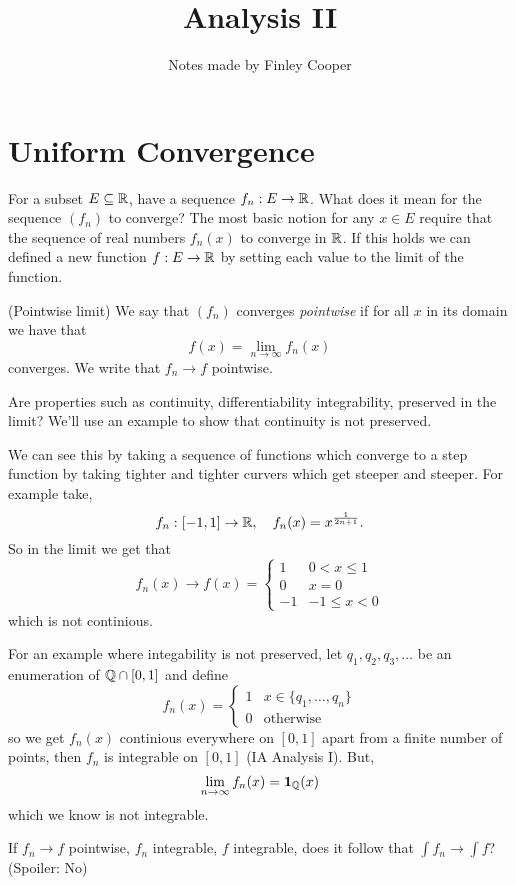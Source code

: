 \documentclass{article}
\title{Analysis II}
\author{Notes made by Finley Cooper}
\begin{document}
  \maketitle
  \newpage
  \tableofcontents
  \newpage
  \section{Uniform Convergence}
For a subset $ E\subseteq \mathbb{R} $, have a sequence $ f_n:E\to \mathbb{R} $. What does it mean for the sequence $ (f_n) $ to converge? The most basic notion for any $ x \in E $ require that the sequence of real numbers $ f_n(x) $ to converge in $ \mathbb{R} $. If this holds we can defined a new function $ f: E\to \mathbb{R} $ by setting each value to the limit of the function.
\begin{definition}
	(Pointwise limit) We say that $ (f_n) $ converges \textit{pointwise} if for all $ x $ in its domain we have that
	\[
		f(x)=\lim_{n\to\infty}f_n(x)
	\]
	converges. We write that $ f_n\to f $ pointwise.
\end{definition}
Are properties such as continuity, differentiability integrability, preserved in the limit? We'll use an example to show that continuity is not preserved.\par
We can see this by taking a sequence of functions which converge to a step function by taking tighter and tighter curvers which get steeper and steeper. For example take,
\[
	f_n:[-1,1]\to \mathbb{R},\quad f_n(x)=x^{\frac 1{2n+1}}.
\]
So in the limit we get that
\[
  f_n(x)\to f(x)=\begin{cases}
	  1 & 0< x \le 1 \\
	  0 & x = 0 \\
	  -1 & -1\le x < 0 
  \end{cases}
\]
which is not continious.\par
For an example where integability is not preserved, let $ q_1,q_2,q_3,\dots $ be an enumeration of $ \mathbb{Q}\cap [0,1] $ and define
\[
  f_n(x)=\begin{cases}
	  1 & x\in\{q_1,\dots, q_n\} \\
	  0 & \text{otherwise}
  \end{cases}
\]
so we get $ f_n(x) $ continious everywhere on $ [0,1] $ apart from a finite number of points, then $ f_n $ is integrable on $ [0,1] $ (IA Analysis I). But,
\[
	\lim_{n\to\infty}f_n(x)=\boldsymbol{1}_{\mathbb{Q}}(x)
\]
which we know is not integrable.\par
If $ f_n\to f $ pointwise, $ f_n $ integrable, $ f $ integrable, does it follow that $ \int f_n\to\int f $? (Spoiler: No)
\end{document}
